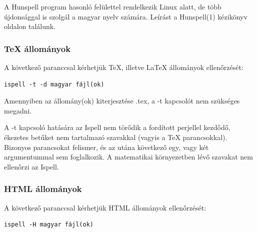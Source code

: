 A Hunspell program hasonló felülettel rendelkezik Linux alatt,
de több újdonsággal is szolgál a magyar nyelv számára.
Leírást a Hunspell(1) kézikönyv oldalon találunk.

\subsubsection{\TeX{} állományok}

A következő paranccsal kérhetjük \TeX{}, illetve \LaTeX{} állományok
ellenőrzését:

\begin{verbatim}
ispell -t -d magyar fájl(ok)
\end{verbatim}

Amennyiben az állomány(ok) kiterjesztése .tex, a -t kapcsolót
nem szükséges megadni.

A -t kapcsoló hatására az Ispell nem törődik
a fordított perjellel kezdődő, ékezetes betűket nem tartalmazó
szavakkal (vagyis a TeX parancsokkal). Bizonyos parancsokat
felismer, és az utána következő egy, vagy két argumentummal
sem foglalkozik. A matematikai környezetben lévő szavakat
nem ellenőrzi az Ispell.

\subsubsection{HTML állományok}

A következő paranccsal kérhetjük HTML állományok
ellenőrzését:

\begin{verbatim}
ispell -H magyar fájl(ok)
\end{verbatim}

